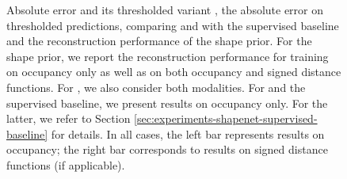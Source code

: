 \begin{figure}
  
  \caption{Absolute error \Abs and its thresholded variant \AbsThr,
  \ie the absolute error on thresholded predictions,
  comparing \AML and \EVAE with the supervised baseline and the
  reconstruction performance of the shape prior. For the \VAE shape prior,
  we report the reconstruction performance for training on
  occupancy only as well as on both occupancy and signed distance functions.
  For \AML, we also consider both modalities. For \EVAE and the supervised baseline,
  we present results on occupancy only. For the latter, we refer to
  Section \ref{sec:experiments-shapenet-supervised-baseline}
  for details. In all cases, the left bar represents
  results on occupancy; the right bar corresponds to results on signed distance
  functions (if applicable).}
  \label{fig:experiments-shapenet-aml-abs}
\end{figure}
